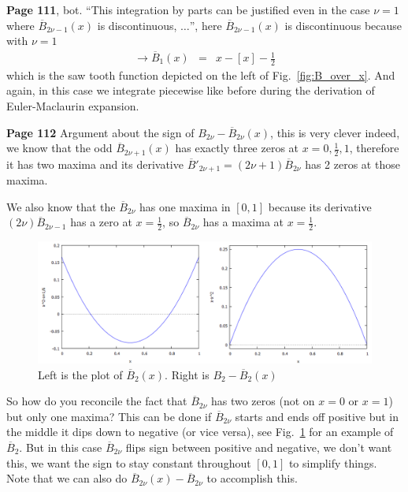 \documentclass[aps,preprint,preprintnumbers,nofootinbib,showpacs,prd]{revtex4-1}
\newcommand{\nbea}{\begin{eqnarray*}}
\newcommand{\neea}{\end{eqnarray*}}
\begin{document}
{\bf Page 111}, bot. ``This integration by parts can be justified even in the case $\nu=1$ where $\overline{B}_{2\nu-1}(x)$ is discontinuous, $\dots$'', here $\overline{B}_{2\nu-1}(x)$ is discontinuous because with $\nu=1$
%
\nbea
\to \overline{B}_1(x) & = & x - [x] - \frac{1}{2}
\neea
%
which is the saw tooth function depicted on the left of Fig.~\ref{fig:B_over_x}. And again, in this case we integrate piecewise like before during the derivation of Euler-Maclaurin expansion.

{\bf Page 112} Argument about the sign of $B_{2\nu} - \overline{B}_{2\nu}(x)$, this is very clever indeed, we know that the odd $\overline{B}_{2\nu+1}(x)$ has exactly three zeros at $x = 0,\frac{1}{2},1$, therefore it has two maxima and its derivative $\overline{B}'_{2\nu+1} = (2\nu + 1)\overline{B}_{2\nu}$ has 2 zeros at those maxima.

We also know that the $\overline{B}_{2\nu}$ has one maxima in $[0,1]$ because its derivative $(2\nu)\overline{B}_{2\nu - 1}$ has a zero at $x=\frac{1}{2}$, so $\overline{B}_{2\nu}$ has a maxima at $x = \frac{1}{2}$.

%
\begin{figure}
\centering
  \includegraphics[width=1.00\linewidth]{B2.png}
  \caption{Left is the plot of $\overline{B}_2(x)$. Right is $B_2 - \overline{B}_2(x)$}
\label{fig:B2}
\end{figure}
%
So how do you reconcile the fact that $\overline{B}_{2\nu}$ has two zeros (not on $x=0$ or $x=1$) but only one maxima? This can be done if $\overline{B}_{2\nu}$ starts and ends off positive but in the middle it dips down to negative (or vice versa), see Fig.~\ref{fig:B2} for an example of $\overline{B}_2$. But in this case $\overline{B}_{2\nu}$ flips sign between positive and negative, we don't want this, we want the sign to stay constant throughout $[0,1]$ to simplify things. Note that we can also do $\overline{B}_{2\nu}(x) - \overline{B}_{2\nu}$ to accomplish this.
\end{document}

